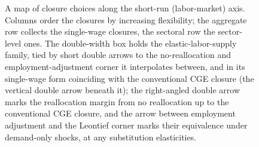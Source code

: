 \begin{figure}[htbp]
\caption{A map of closure choices along the short-run (labor-market)
  axis. Columns order the closures by increasing flexibility; the
  aggregate row collects the single-wage closures, the sectoral row the
  sector-level ones. The double-width box holds the elastic-labor-supply
  family, tied by short double arrows to the no-reallocation and
  employment-adjustment corner it interpolates between, and in its single-wage
  form coinciding with the conventional CGE closure (the vertical double
  arrow beneath it); the right-angled double
  arrow marks the reallocation margin from no reallocation up to the
  conventional CGE closure, and the arrow between employment adjustment and
  the Leontief corner marks their equivalence under demand-only shocks,
  at any substitution elasticities.}
\label{fig:flexibility-map}
\end{figure}